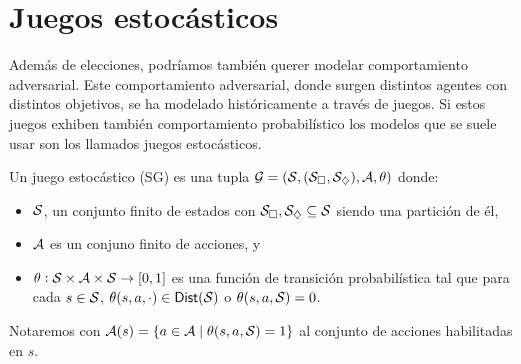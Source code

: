



\section{Juegos estocásticos}

Además de elecciones, podríamos también querer modelar comportamiento
adversarial. Este comportamiento adversarial, donde surgen distintos agentes
con distintos objetivos, se ha modelado históricamente a través de juegos. Si
estos juegos exhiben también comportamiento probabilístico los modelos que se
suele usar son los llamados juegos estocásticos.

\begin{definition}
	Un juego estocástico (SG) es una tupla $\mathcal{G} = (\mathcal{S}, (\mathcal{S}_\square, \mathcal{S}_\diamondsuit), \mathcal{A}, \theta)$ donde:
	\begin{itemize}
		\item $\mathcal{S}$, un conjunto finito de estados con $\mathcal{S}_\square, \mathcal{S}_\diamondsuit \subseteq \mathcal{S}$ siendo una partición de él,
		\item $\mathcal{A}$ es un conjuno finito de acciones, y
		\item $\theta : \mathcal{S} \times \mathcal{A} \times \mathcal{S} \rightarrow [0,1]$ es una función de transición probabilística tal que para cada $s \in \mathcal{S}$, $\theta(s, a, \cdot) \in \mathsf{Dist}(\mathcal{S})$ o  $\theta(s, a, \mathcal{S}) = 0$.
	\end{itemize}
	Notaremos con $\mathcal{A}(s) = \{a \in \mathcal{A} \mid \theta(s,a,\mathcal{S}) = 1\}$ al conjunto de acciones habilitadas en $s$.
\end{definition}

